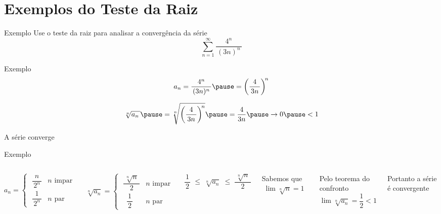 \section{Exemplos do Teste da Raiz}

\addtocounter{exemplo}{1}
\begin{frame}{Exemplo \theexemplo}
  Use o teste da raiz para analisar a convergência da série
  \[
  \sum_{n=1}^\infty \frac{4^n}{\,(3n)^n\,}
  \]
\end{frame}

\begin{frame}{Exemplo \theexemplo}
  \[
  a_n
  = \frac{4^n}{\,(3n)^n\,}
  \pause
  = \left(\frac{4}{\,3n\,}\right)^{\!n}
  \]

  \pause
  \[
  \sqrt[n]{a_n\,}
  \pause
  = \sqrt[n]{\left(\frac{4}{\,3n\,}\right)^{\!n}}
  \pause
  = \frac{4}{3n}
  \pause
  \to 0
  \pause
  < 1
  \]

  A série converge
\end{frame}

\addtocounter{exemplo}{1}
\begin{frame}{Exemplo \theexemplo}
	\begin{columns}
		\[
		a_n = \begin{cases}
			\displaystyle \;\dfrac{n}{\,2^n\,} & n \text{ impar} \\[5mm]
			\displaystyle \;\dfrac{1}{\,2^n\,} & n \text{ par}
		\end{cases}
		\]

		\pause
		\vspace{0.5\baselineskip}
		\[
		\sqrt[n]{a_n} = \begin{cases}
			\displaystyle \;\dfrac{\,\sqrt[n]{n}\,}{2} & n \text{ impar} \\[5mm]
			\displaystyle \;\;\,\dfrac{1}{\,2\,}       & n \text{ par}
		\end{cases}
		\]

		\pause
		\[
		\frac{1}{\,2\,} \;\leq\; \sqrt[n]{a_n} \;\leq\; \frac{\,\sqrt[n]{n}\,}{2}
		\]

		\pause
		Sabemos que \(\; \lim\sqrt[n]{n} = 1 \)

		\pause
		\vspace{.5\baselineskip}
		Pelo teorema do confronto
		\[\lim\sqrt[n]{a_n} = \frac{1}{2} < 1\]

		\pause
		Portanto a série é convergente

	\end{columns}
\end{frame}

